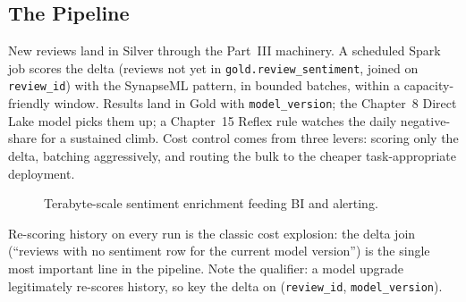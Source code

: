 \subsection{The Pipeline}
New reviews land in Silver through the Part~III machinery. A scheduled Spark job scores the delta (reviews not yet in \texttt{gold.review\_sentiment}, joined on \texttt{review\_id}) with the SynapseML pattern, in bounded batches, within a capacity-friendly window. Results land in Gold with \texttt{model\_version}; the Chapter~8 Direct Lake model picks them up; a Chapter~15 Reflex rule watches the daily negative-share for a sustained climb. Cost control comes from three levers: scoring only the delta, batching aggressively, and routing the bulk to the cheaper task-appropriate deployment.

\begin{figure}[H]
    \centering
    \caption{Terabyte-scale sentiment enrichment feeding BI and alerting.}
    \label{fig:chapter19-sentiment}
\end{figure}

\begin{pitfall}
Re-scoring history on every run is the classic cost explosion: the delta join (``reviews with no sentiment row for the current model version'') is the single most important line in the pipeline. Note the qualifier: a model upgrade legitimately re-scores history, so key the delta on (\texttt{review\_id}, \texttt{model\_version}).
\end{pitfall}

